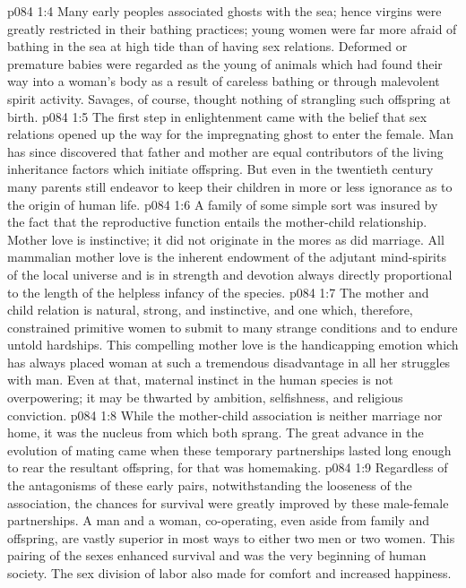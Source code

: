 \vs p084 1:4 Many early peoples associated ghosts with the sea; hence virgins were greatly restricted in their bathing practices; young women were far more afraid of bathing in the sea at high tide than of having sex relations. Deformed or premature babies were regarded as the young of animals which had found their way into a woman’s body as a result of careless bathing or through malevolent spirit activity. Savages, of course, thought nothing of strangling such offspring at birth.
\vs p084 1:5 The first step in enlightenment came with the belief that sex relations opened up the way for the impregnating ghost to enter the female. Man has since discovered that father and mother are equal contributors of the living inheritance factors which initiate offspring. But even in the twentieth century many parents still endeavor to keep their children in more or less ignorance as to the origin of human life.
\vs p084 1:6 \pc A family of some simple sort was insured by the fact that the reproductive function entails the mother\hyp{}child relationship. Mother love is instinctive; it did not originate in the mores as did marriage. All mammalian mother love is the inherent endowment of the adjutant mind\hyp{}spirits of the local universe and is in strength and devotion always directly proportional to the length of the helpless infancy of the species.
\vs p084 1:7 The mother and child relation is natural, strong, and instinctive, and one which, therefore, constrained primitive women to submit to many strange conditions and to endure untold hardships. This compelling mother love is the handicapping emotion which has always placed woman at such a tremendous disadvantage in all her struggles with man. Even at that, maternal instinct in the human species is not overpowering; it may be thwarted by ambition, selfishness, and religious conviction.
\vs p084 1:8 While the mother\hyp{}child association is neither marriage nor home, it was the nucleus from which both sprang. The great advance in the evolution of mating came when these temporary partnerships lasted long enough to rear the resultant offspring, for that was homemaking.
\vs p084 1:9 Regardless of the antagonisms of these early pairs, notwithstanding the looseness of the association, the chances for survival were greatly improved by these male\hyp{}female partnerships. A man and a woman, co\hyp{}operating, even aside from family and offspring, are vastly superior in most ways to either two men or two women. This pairing of the sexes enhanced survival and was the very beginning of human society. The sex division of labor also made for comfort and increased happiness.
